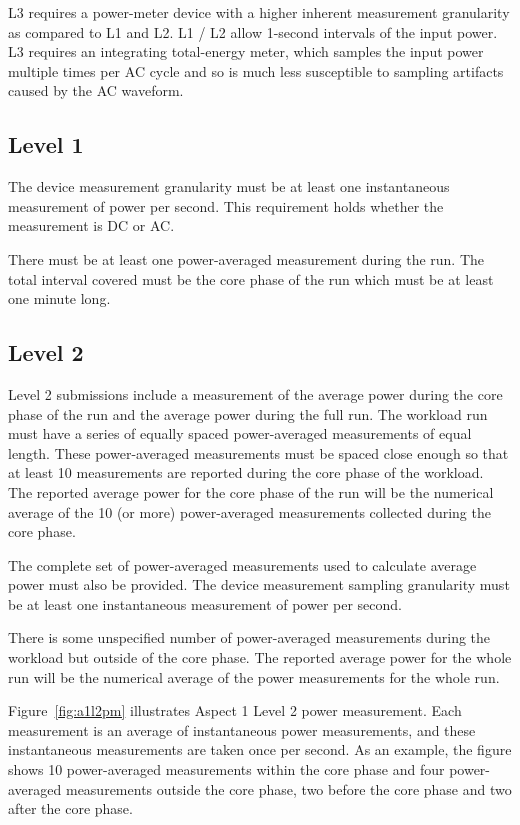 \noindent
L3 requires a power-meter device with a higher inherent measurement granularity as compared to L1 and L2.
L1 / L2 allow 1-second intervals of the input power.
L3 requires an integrating total-energy meter, which samples the input power multiple times per AC cycle and so is much less susceptible to sampling artifacts caused by the AC waveform.  

\subsection{Level 1}
\noindent
The device measurement granularity must be at least one instantaneous measurement of power per second. This requirement holds whether the measurement is DC or AC.
\wl

\noindent
There must be at least one power-averaged measurement during the run.
The total interval covered must be the core phase of the run which must be at
least one minute long.
\wl

\subsection{Level 2}
\noindent
Level 2 submissions include a measurement of the average power during the core phase of the run and the average power during the full run. The workload run must have a series of equally spaced power-averaged measurements of equal length. These power-averaged measurements must be spaced close enough so that at least 10 measurements are reported during the core phase of the workload. The reported average power for the core phase of the run will be the numerical average of the 10 (or more) power-averaged measurements collected during the core phase.  
\wl

\noindent
The complete set of power-averaged measurements used to calculate average power must also be provided.
The device measurement sampling granularity must be at least one instantaneous measurement of power per second.
\wl

\noindent
There is some unspecified number of power-averaged measurements during the workload but outside of the core phase. The reported average power for the whole run will be the numerical average of the power measurements for the whole run.  
\wl


\noindent
Figure~\ref{fig:a1l2pm} illustrates Aspect 1 Level 2 power measurement. Each measurement is an average of instantaneous power measurements, and these instantaneous measurements are taken once per second. As an example, the figure shows 10 power-averaged measurements within the core phase and four power-averaged measurements outside the core phase, two before the core phase and two after the core phase.

